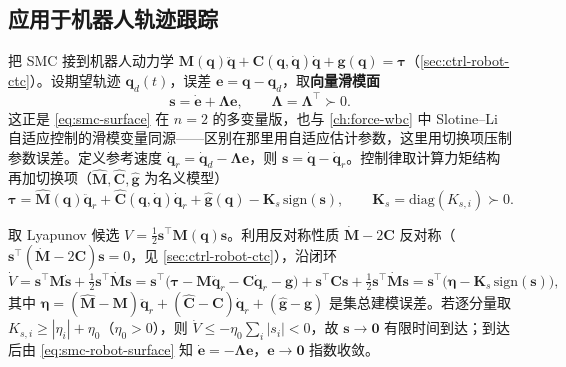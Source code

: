 \subsection{应用于机器人轨迹跟踪}
把 SMC 接到机器人动力学 $\mathbf M(\mathbf q)\ddot{\mathbf q}+\mathbf C(\mathbf q,\dot{\mathbf q})\dot{\mathbf q}+\mathbf g(\mathbf q)=\boldsymbol\tau$（\cref{sec:ctrl-robot-ctc}）。设期望轨迹 $\mathbf q_d(t)$，误差 $\mathbf e=\mathbf q-\mathbf q_d$，取\textbf{向量滑模面}
\begin{equation}
  \mathbf s=\dot{\mathbf e}+\boldsymbol\Lambda\mathbf e,\qquad \boldsymbol\Lambda=\boldsymbol\Lambda^\top\succ0.
  \label{eq:smc-robot-surface}
\end{equation}
这正是 \cref{eq:smc-surface} 在 $n=2$ 的多变量版，也与 \cref{ch:force-wbc} 中 Slotine--Li 自适应控制的滑模变量同源——区别在那里用自适应估计参数，这里用切换项压制参数误差。定义参考速度 $\dot{\mathbf q}_r=\dot{\mathbf q}_d-\boldsymbol\Lambda\mathbf e$，则 $\mathbf s=\dot{\mathbf q}-\dot{\mathbf q}_r$。控制律取计算力矩结构再加切换项（$\hat{\mathbf M},\hat{\mathbf C},\hat{\mathbf g}$ 为名义模型）
\begin{equation}
  \boldsymbol\tau=\hat{\mathbf M}(\mathbf q)\ddot{\mathbf q}_r+\hat{\mathbf C}(\mathbf q,\dot{\mathbf q})\dot{\mathbf q}_r+\hat{\mathbf g}(\mathbf q)-\mathbf K_s\,\mathrm{sign}(\mathbf s),\qquad \mathbf K_s=\mathrm{diag}(K_{s,i})\succ0.
  \label{eq:smc-robot-law}
\end{equation}

\begin{theorem}
\label{thm:smc-robot}
取 Lyapunov 候选 $V=\tfrac12\mathbf s^\top\mathbf M(\mathbf q)\mathbf s$。利用反对称性质 $\dot{\mathbf M}-2\mathbf C$ 反对称（$\mathbf s^\top(\dot{\mathbf M}-2\mathbf C)\mathbf s=0$，见 \cref{sec:ctrl-robot-ctc}），沿闭环
\begin{equation}
  \dot V=\mathbf s^\top\mathbf M\dot{\mathbf s}+\tfrac12\mathbf s^\top\dot{\mathbf M}\mathbf s
       =\mathbf s^\top\big(\boldsymbol\tau-\mathbf M\ddot{\mathbf q}_r-\mathbf C\dot{\mathbf q}_r-\mathbf g\big)+\mathbf s^\top\mathbf C\mathbf s+\tfrac12\mathbf s^\top\dot{\mathbf M}\mathbf s
       =\mathbf s^\top\big(\boldsymbol\eta-\mathbf K_s\,\mathrm{sign}(\mathbf s)\big),
  \label{eq:smc-robot-vdot}
\end{equation}
其中 $\boldsymbol\eta=(\hat{\mathbf M}-\mathbf M)\ddot{\mathbf q}_r+(\hat{\mathbf C}-\mathbf C)\dot{\mathbf q}_r+(\hat{\mathbf g}-\mathbf g)$ 是集总建模误差。若逐分量取 $K_{s,i}\ge|\eta_i|+\eta_0$（$\eta_0>0$），则 $\dot V\le-\eta_0\sum_i|s_i|<0$，故 $\mathbf s\to\mathbf 0$ 有限时间到达；到达后由 \cref{eq:smc-robot-surface} 知 $\dot{\mathbf e}=-\boldsymbol\Lambda\mathbf e$，$\mathbf e\to\mathbf 0$ 指数收敛。
\end{theorem}

